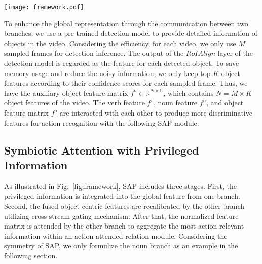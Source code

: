 \documentclass[letterpaper]{article} \usepackage{aaai20}  \usepackage{times}  \usepackage{helvet} \usepackage{courier}  \usepackage[hyphens]{url}  \usepackage{graphicx} \urlstyle{rm} \def\UrlFont{\rm}  \usepackage{graphicx}  \frenchspacing  \setlength{\pdfpagewidth}{8.5in}  \setlength{\pdfpageheight}{11in}  \usepackage{amsfonts,amssymb}
\begin{document}
\begin{figure*}[t]
\center
\texttt{[image: framework.pdf]}
\caption{
The proposed method. Our framework consists of three feature extractors and one interaction module SAP. 
VerbNet and NounNet produce global features. Detection Model generates a set of local object features as privileged information. 
The privileged information is integrated into the global features to obtain object-centric feature matrices. These feature matrices are normalized by a cross stream gating mechanism. After that, the object-centric matrices are attended by the other branch to select the most action-relevant information. The outputs of SAP are used to classify the verb and noun, respectively.
}
\label{fig:framework}  
\end{figure*}
To enhance the global representation through the communication between two branches, we use a pre-trained detection model to provide detailed information of objects in the video.
Considering the efficiency, for each video, we only use $M$ sampled frames for detection inference.
The output of the $RoIAlign$ layer of the detection model is regarded as the feature for each detected object.
To save memory usage and reduce the noisy information, we only keep top-$K$ object features according to their confidence scores for each sampled frame.
Thus, we have the auxiliary object feature matrix ${f^o}\in \mathbb{R}^{N \times C}$, which contains $N = M\times K$ object features of the video. The verb feature ${f^v}$, noun feature ${f^n}$, and object feature matrix ${f^o}$ are interacted with each other to produce more discriminative features for action recognition with the following SAP module.

\subsection{Symbiotic Attention with Privileged Information}
As illustrated in Fig.~\ref{fig:framework}, SAP includes three stages. First, the privileged information is integrated into the global feature from one branch. Second, the fused object-centric features are recalibrated by the other branch utilizing cross stream gating mechanism. After that, the normalized feature matrix is attended by the other branch to aggregate the most action-relevant information within an action-attended relation module. Considering the symmetry of SAP, we only formulize the noun branch as an example in the following section. 
\end{document}
